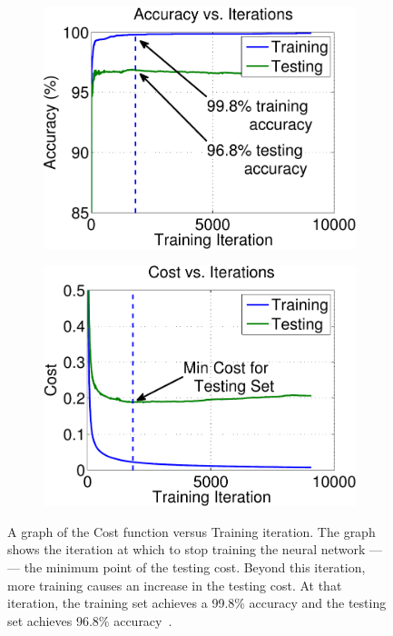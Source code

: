 %
\begin{figure}
\centering
\begin{subfigure}[b]{0.5\columnwidth}
\centering
\includegraphics[width=\columnwidth]{ch5/figs/accu_vs_iter_f20.pdf}
\end{subfigure}%
\begin{subfigure}[b]{0.5\columnwidth}
\centering
\includegraphics[width=\columnwidth]{ch5/figs/cost_vs_iter_f20.pdf}
\end{subfigure}
\caption{A graph of the Cost function versus Training iteration.
The graph shows the iteration at which to stop training the neural network
--- --- the minimum point of the testing cost.
Beyond this iteration, more training causes an increase in the testing cost.
At that iteration, the training set achieves a 99.8\% accuracy and the
testing set achieves 96.8\% accuracy~\cite{lo2013augmediated}.}
\label{stop_graph}
\end{figure}
